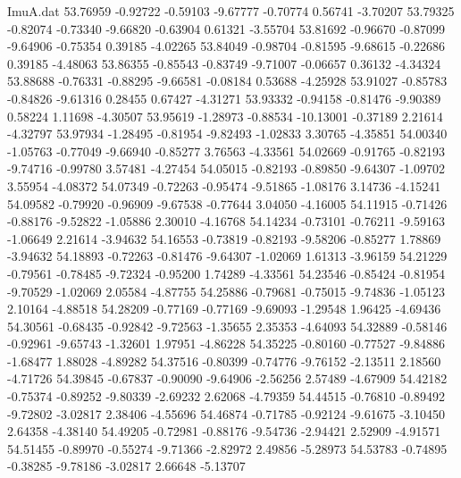 \begin{filecontents}{ImuA.dat}
  53.76959   -0.92722   -0.59103   -9.67777   -0.70774    0.56741   -3.70207
  53.79325   -0.82074   -0.73340   -9.66820   -0.63904    0.61321   -3.55704
  53.81692   -0.96670   -0.87099   -9.64906   -0.75354    0.39185   -4.02265
  53.84049   -0.98704   -0.81595   -9.68615   -0.22686    0.39185   -4.48063
  53.86355   -0.85543   -0.83749   -9.71007   -0.06657    0.36132   -4.34324
  53.88688   -0.76331   -0.88295   -9.66581   -0.08184    0.53688   -4.25928
  53.91027   -0.85783   -0.84826   -9.61316    0.28455    0.67427   -4.31271
  53.93332   -0.94158   -0.81476   -9.90389    0.58224    1.11698   -4.30507
  53.95619   -1.28973   -0.88534  -10.13001   -0.37189    2.21614   -4.32797
  53.97934   -1.28495   -0.81954   -9.82493   -1.02833    3.30765   -4.35851
  54.00340   -1.05763   -0.77049   -9.66940   -0.85277    3.76563   -4.33561
  54.02669   -0.91765   -0.82193   -9.74716   -0.99780    3.57481   -4.27454
  54.05015   -0.82193   -0.89850   -9.64307   -1.09702    3.55954   -4.08372
  54.07349   -0.72263   -0.95474   -9.51865   -1.08176    3.14736   -4.15241
  54.09582   -0.79920   -0.96909   -9.67538   -0.77644    3.04050   -4.16005
  54.11915   -0.71426   -0.88176   -9.52822   -1.05886    2.30010   -4.16768
  54.14234   -0.73101   -0.76211   -9.59163   -1.06649    2.21614   -3.94632
  54.16553   -0.73819   -0.82193   -9.58206   -0.85277    1.78869   -3.94632
  54.18893   -0.72263   -0.81476   -9.64307   -1.02069    1.61313   -3.96159
  54.21229   -0.79561   -0.78485   -9.72324   -0.95200    1.74289   -4.33561
  54.23546   -0.85424   -0.81954   -9.70529   -1.02069    2.05584   -4.87755
  54.25886   -0.79681   -0.75015   -9.74836   -1.05123    2.10164   -4.88518
  54.28209   -0.77169   -0.77169   -9.69093   -1.29548    1.96425   -4.69436
  54.30561   -0.68435   -0.92842   -9.72563   -1.35655    2.35353   -4.64093
  54.32889   -0.58146   -0.92961   -9.65743   -1.32601    1.97951   -4.86228
  54.35225   -0.80160   -0.77527   -9.84886   -1.68477    1.88028   -4.89282
  54.37516   -0.80399   -0.74776   -9.76152   -2.13511    2.18560   -4.71726
  54.39845   -0.67837   -0.90090   -9.64906   -2.56256    2.57489   -4.67909
  54.42182   -0.75374   -0.89252   -9.80339   -2.69232    2.62068   -4.79359
  54.44515   -0.76810   -0.89492   -9.72802   -3.02817    2.38406   -4.55696
  54.46874   -0.71785   -0.92124   -9.61675   -3.10450    2.64358   -4.38140
  54.49205   -0.72981   -0.88176   -9.54736   -2.94421    2.52909   -4.91571
  54.51455   -0.89970   -0.55274   -9.71366   -2.82972    2.49856   -5.28973
  54.53783   -0.74895   -0.38285   -9.78186   -3.02817    2.66648   -5.13707

\end{filecontents}
